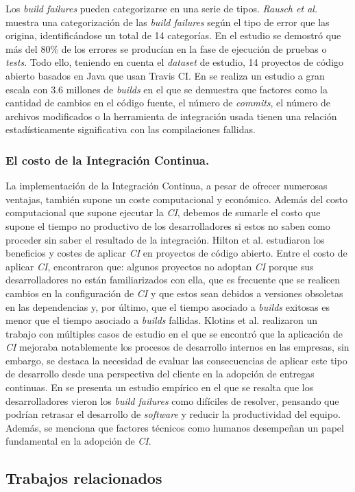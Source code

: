 Los \textit{build failures} pueden categorizarse en una serie de tipos. \textit{Rausch et al.}
\cite{16} muestra una categorización de las \textit{build failures} según el tipo de error
que las origina, identificándose un total de 14 categorías. En el estudio se demostró que más
del 80\% de los errores se producían en la fase de ejecución de pruebas o \textit{tests}. Todo
ello, teniendo en cuenta el \textit{dataset} de estudio, 14 proyectos de código abierto basados
en Java que usan Travis CI. En \cite{19} se realiza un estudio a gran escala con 3.6 millones
de \textit{builds} en el que se demuestra que factores como la cantidad de cambios en el código
fuente, el número de \textit{commits}, el número de archivos modificados o la herramienta de
integración usada tienen una relación estadísticamente significativa con las compilaciones
fallidas.\\ 

\subsubsection{El costo de la Integración Continua.}
La implementación de la Integración Continua, a pesar de ofrecer numerosas ventajas, también
supone un coste computacional y económico. Además del costo computacional que supone ejecutar
la \textit{CI}, debemos de sumarle el costo que supone el tiempo no productivo de los
desarrolladores si estos no saben como proceder sin saber el resultado de la integración.
Hilton et al. \cite{2} estudiaron los beneficios y costes de aplicar \textit{CI} en proyectos
de código abierto. Entre el costo de aplicar \textit{CI}, encontraron que: algunos proyectos
no adoptan \textit{CI} porque sus desarrolladores no están familiarizados con ella, que es
frecuente que se realicen cambios en la configuración de \textit{CI} y que estos sean debidos
a versiones obsoletas en las dependencias y, por último, que el tiempo asociado a
\textit{builds} exitosas es menor que el tiempo asociado a \textit{builds} fallidas. Klotins et
al. \cite{21} realizaron un trabajo con múltiples casos de estudio en el que se encontró que
la aplicación de \textit{CI} mejoraba notablemente los procesos de desarrollo internos en las
empresas, sin embargo, se destaca la necesidad de evaluar las consecuencias de aplicar este
tipo de desarrollo desde una perspectiva del cliente en la adopción de entregas continuas. En
\cite{20} se presenta un estudio empírico en el que se resalta que los desarrolladores vieron
los \textit{build failures} como difíciles de resolver, pensando que podrían retrasar el
desarrollo de \textit{software} y reducir la productividad del equipo. Además, se menciona
que factores técnicos como humanos desempeñan un papel fundamental en la adopción de
\textit{CI}.\\

\subsection{Trabajos relacionados}
